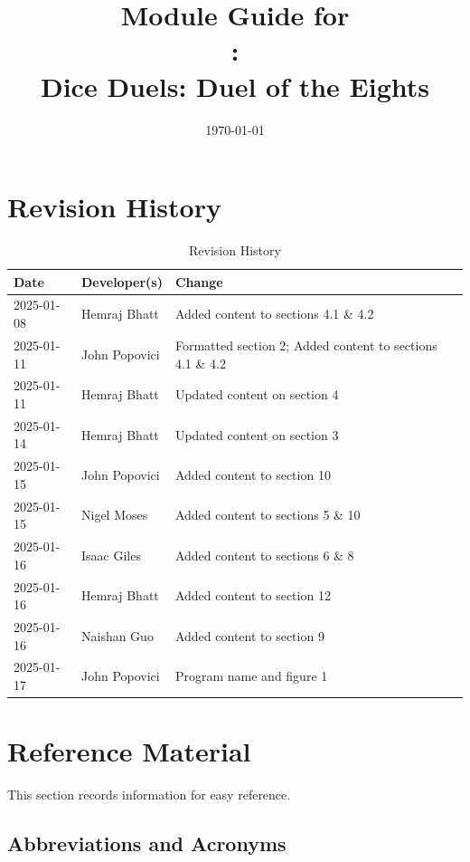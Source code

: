 \documentclass[12pt, titlepage]{article}
\begin{document}
\title{Module Guide for \\\progname: \\Dice Duels: Duel of the Eights} 
\author{\authname}
\date{\today}

\maketitle


\section{Revision History}

\begin{table}[hp]
\caption{Revision History} \label{TblRevisionHistory}
\begin{tabularx}{\textwidth}{llX}
\toprule
\textbf{Date} & \textbf{Developer(s)} & \textbf{Change}\\
\midrule
2025-01-08 & Hemraj Bhatt & Added content to sections 4.1 \& 4.2\\
2025-01-11 & John Popovici & Formatted section 2; Added content to sections 4.1 \& 4.2\\
2025-01-11 & Hemraj Bhatt & Updated content on section 4\\
2025-01-14 & Hemraj Bhatt & Updated content on section 3\\
2025-01-15 & John Popovici & Added content to section 10\\
2025-01-15 & Nigel Moses & Added content to sections 5 \& 10\\
2025-01-16 & Isaac Giles & Added content to sections 6 \& 8\\
2025-01-16 & Hemraj Bhatt & Added content to section 12\\
2025-01-16 & Naishan Guo & Added content to section 9\\
2025-01-17 & John Popovici & Program name and figure 1\\
\bottomrule
\end{tabularx}
\end{table}

\newpage

\section{Reference Material}

This section records information for easy reference.

\subsection{Abbreviations and Acronyms}
\end{document}
